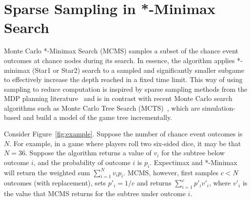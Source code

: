 \documentclass{article}
\begin{document}
\section{Sparse Sampling in *-Minimax Search}

Monte Carlo *-Minimax Search (MCMS) samples a subset of the chance event outcomes at chance nodes
during its search. In essence, the algorithm applies *-minimax (Star1 or Star2) search to a sampled 
and significantly smaller subgame to effectively increase the depth reached in a fixed time limit. 
This way of using sampling to reduce computation is inspired by sparse sampling methods from the 
MDP planning literature~\cite{kearns99} and is in contrast with recent Monte Carlo search algorithms such as Monte 
Carlo Tree Search (MCTS)~\cite{Coulom07Efficient}, which are simulation-based and build a model of 
the game tree incrementally.

Consider Figure~\ref{fig:example}. Suppose the number of chance event outcomes is $N$. 
For example, in a game where players roll two six-sided dice, it may be that $N = 36$.  
Suppose the algorithm returns a value of $v_i$ for the subtree below outcome $i$, and the probability of outcome
$i$ is $p_i$. Expectimax and *-Minimax will return the weighted sum $\sum_{i = 1}^N v_i p_i$. MCMS, however, 
first samples $c < N$ outcomes (with replacement), sets $p'_i = 1/c$ and returns $\sum_{i = 1}^c p'_i v'_i$, 
where $v'_i$ is the value that MCMS returns for the subtree under outcome $i$. 
\end{document}
